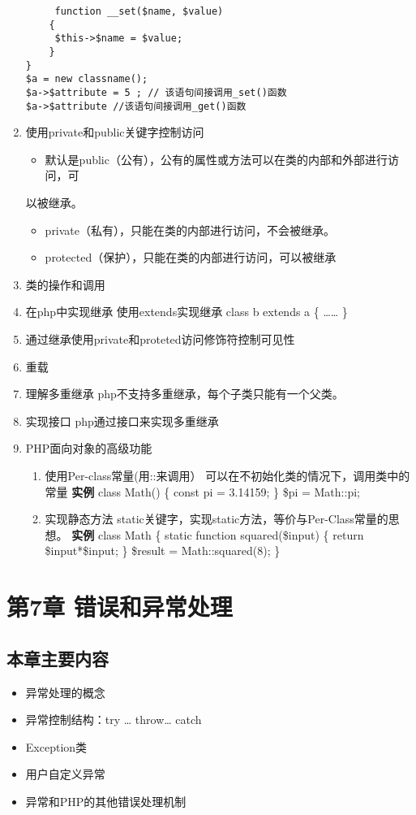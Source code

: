 \documentclass[11pt]{article}
\begin{document}
\begin{enumerate}
\begin{verbatim}
     function __set($name, $value)
    {
	 $this->$name = $value;
    }
}
$a = new classname();
$a->$attribute = 5 ; // 该语句间接调用_set()函数
$a->$attribute //该语句间接调用_get()函数
\end{verbatim}
\item 使用private和public关键字控制访问
\label{sec:org09062b4}
\begin{itemize}
\item 默认是public（公有），公有的属性或方法可以在类的内部和外部进行访问，可
\end{itemize}
以被继承。
\begin{itemize}
\item private（私有），只能在类的内部进行访问，不会被继承。
\item protected（保护），只能在类的内部进行访问，可以被继承
\end{itemize}
\item 类的操作和调用
\label{sec:org2bd4ae2}
\item 在php中实现继承
\label{sec:orga84dc63}
使用extends实现继承
class b extends a
\{
     ……
\}
\item 通过继承使用private和proteted访问修饰符控制可见性
\label{sec:org74c7c72}
\item 重载
\label{sec:org61fe4f0}
\item 理解多重继承
\label{sec:org72b5221}
php不支持多重继承，每个子类只能有一个父类。
\item 实现接口
\label{sec:orgf2321ff}
php通过接口来实现多重继承
\item PHP面向对象的高级功能
\label{sec:org6d5743c}
\begin{enumerate}
\item 使用Per-class常量(用::来调用）
\label{sec:org8161178}
可以在不初始化类的情况下，调用类中的常量
\textbf{实例}
class Math()
\{
     const pi = 3.14159;
\}
\$pi = Math::pi;
\item 实现静态方法
\label{sec:orgedb8370}
static关键字，实现static方法，等价与Per-Class常量的思想。
\textbf{实例}
class Math
\{
      static function squared(\$input)
\{
             return \$input*\$input;
\}
\$result = Math::squared(8);
\}
\end{enumerate}
\end{enumerate}
\section{第7章 错误和异常处理}
\label{sec:org5489ff6}
\subsection{本章主要内容}
\label{sec:org81f8f31}
\begin{itemize}
\item 异常处理的概念
\item 异常控制结构：try \ldots{} throw\ldots{} catch
\item Exception类
\item 用户自定义异常
\item 异常和PHP的其他错误处理机制
\end{itemize}
\end{document}
